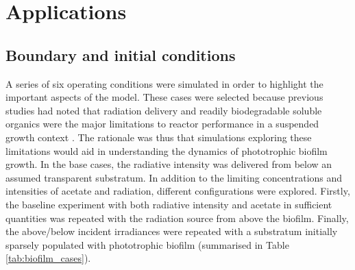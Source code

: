 \section{Applications}
\subsection{Boundary and initial conditions}
A series of six operating conditions were simulated in order to highlight the important aspects of the model. These cases were selected because previous studies had noted that radiation delivery and readily biodegradable soluble organics were the major limitations to reactor performance in a suspended growth context \cite{hulsen2016, hulsen2016a}. The rationale was thus that simulations exploring these limitations would aid in understanding the dynamics of phototrophic biofilm growth. In the base cases, the radiative intensity was delivered from below an assumed transparent substratum. In addition to the limiting concentrations and intensities of acetate and radiation, different configurations were explored. Firstly, the baseline experiment with both radiative intensity and acetate in sufficient quantities was repeated with the radiation source from above the biofilm. Finally, the above/below incident irradiances were repeated with a substratum initially sparsely populated with phototrophic biofilm (summarised in Table \ref{tab:biofilm_cases}). 

